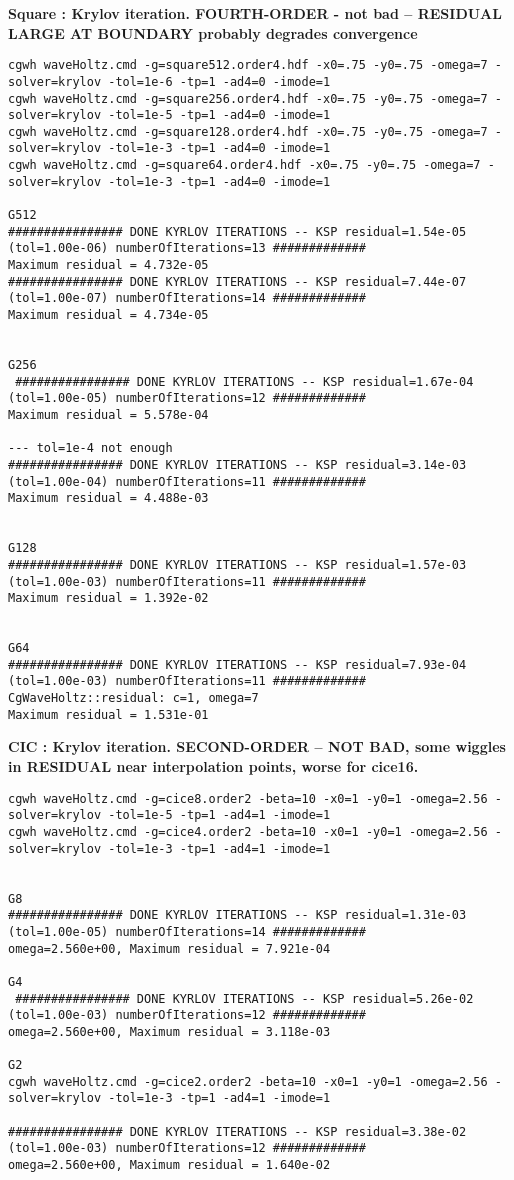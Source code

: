 \bigskip
\textbf{Square  : Krylov iteration. FOURTH-ORDER  - not bad -- RESIDUAL LARGE AT BOUNDARY probably degrades convergence}
\begin{Verbatim}[fontsize=\scriptsize]
cgwh waveHoltz.cmd -g=square512.order4.hdf -x0=.75 -y0=.75 -omega=7 -solver=krylov -tol=1e-6 -tp=1 -ad4=0 -imode=1
cgwh waveHoltz.cmd -g=square256.order4.hdf -x0=.75 -y0=.75 -omega=7 -solver=krylov -tol=1e-5 -tp=1 -ad4=0 -imode=1
cgwh waveHoltz.cmd -g=square128.order4.hdf -x0=.75 -y0=.75 -omega=7 -solver=krylov -tol=1e-3 -tp=1 -ad4=0 -imode=1
cgwh waveHoltz.cmd -g=square64.order4.hdf -x0=.75 -y0=.75 -omega=7 -solver=krylov -tol=1e-3 -tp=1 -ad4=0 -imode=1

G512
################ DONE KYRLOV ITERATIONS -- KSP residual=1.54e-05 (tol=1.00e-06) numberOfIterations=13 #############
Maximum residual = 4.732e-05
################ DONE KYRLOV ITERATIONS -- KSP residual=7.44e-07 (tol=1.00e-07) numberOfIterations=14 #############
Maximum residual = 4.734e-05


G256
 ################ DONE KYRLOV ITERATIONS -- KSP residual=1.67e-04 (tol=1.00e-05) numberOfIterations=12 #############
Maximum residual = 5.578e-04

--- tol=1e-4 not enough
################ DONE KYRLOV ITERATIONS -- KSP residual=3.14e-03 (tol=1.00e-04) numberOfIterations=11 #############
Maximum residual = 4.488e-03


G128 
################ DONE KYRLOV ITERATIONS -- KSP residual=1.57e-03 (tol=1.00e-03) numberOfIterations=11 #############
Maximum residual = 1.392e-02


G64 
################ DONE KYRLOV ITERATIONS -- KSP residual=7.93e-04 (tol=1.00e-03) numberOfIterations=11 #############
CgWaveHoltz::residual: c=1, omega=7
Maximum residual = 1.531e-01

\end{Verbatim}

\bigskip
\bigskip
\bigskip
\textbf{CIC  : Krylov iteration. SECOND-ORDER -- NOT BAD, some wiggles in RESIDUAL near interpolation points, worse for cice16.}
\begin{Verbatim}[fontsize=\scriptsize]
cgwh waveHoltz.cmd -g=cice8.order2 -beta=10 -x0=1 -y0=1 -omega=2.56 -solver=krylov -tol=1e-5 -tp=1 -ad4=1 -imode=1
cgwh waveHoltz.cmd -g=cice4.order2 -beta=10 -x0=1 -y0=1 -omega=2.56 -solver=krylov -tol=1e-3 -tp=1 -ad4=1 -imode=1


G8
################ DONE KYRLOV ITERATIONS -- KSP residual=1.31e-03 (tol=1.00e-05) numberOfIterations=14 #############
omega=2.560e+00, Maximum residual = 7.921e-04

G4
 ################ DONE KYRLOV ITERATIONS -- KSP residual=5.26e-02 (tol=1.00e-03) numberOfIterations=12 #############
omega=2.560e+00, Maximum residual = 3.118e-03

G2 
cgwh waveHoltz.cmd -g=cice2.order2 -beta=10 -x0=1 -y0=1 -omega=2.56 -solver=krylov -tol=1e-3 -tp=1 -ad4=1 -imode=1

################ DONE KYRLOV ITERATIONS -- KSP residual=3.38e-02 (tol=1.00e-03) numberOfIterations=12 #############
omega=2.560e+00, Maximum residual = 1.640e-02

\end{Verbatim}

